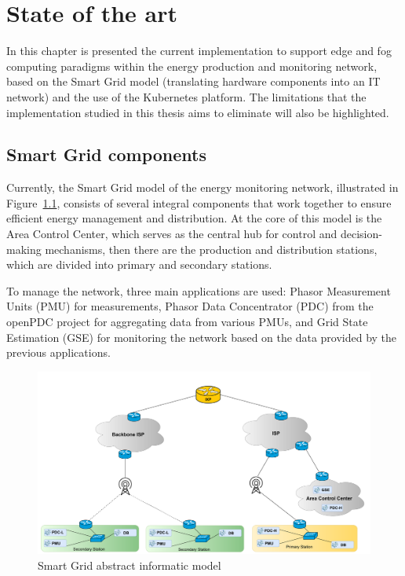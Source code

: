 \chapter{State of the art}
In this chapter is presented the current implementation to support edge and fog computing paradigms within the energy production and monitoring network, based on the Smart Grid model (translating hardware components into an IT network) and the use of the Kubernetes platform. The limitations that the implementation studied in this thesis aims to eliminate will also be highlighted.

\section{Smart Grid components}
Currently, the Smart Grid model of the energy monitoring network, illustrated in Figure~\ref{fig:art-state}, consists of several integral components that work together to ensure efficient energy management and distribution. At the core of this model is the Area Control Center, which serves as the central hub for control and decision-making mechanisms, then there are the production and distribution stations, which are divided into primary and secondary stations. 

To manage the network, three main applications are used: Phasor Measurement Units (PMU) for measurements, Phasor Data Concentrator (PDC) from the openPDC project for aggregating data from various PMUs, and Grid State Estimation (GSE) for monitoring the network based on the data provided by the previous applications. 

\begin{figure}[ht]\centering
\includegraphics[scale=0.17]{Pictures/state-of-art}
\caption{Smart Grid abstract informatic model}\label{fig:art-state}
\end{figure}

